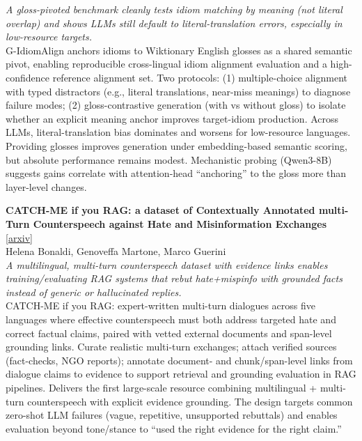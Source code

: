 \documentclass[12pt,letterpaper]{article}
\begin{document}
{\small\textit{A gloss-pivoted benchmark cleanly tests idiom matching by meaning (not literal overlap) and shows LLMs still default to literal-translation errors, especially in low-resource targets.}}\\[1pt]
{\footnotesize G-IdiomAlign anchors idioms to Wiktionary English glosses as a shared semantic pivot, enabling reproducible cross-lingual idiom alignment evaluation and a high-confidence reference alignment set. Two protocols: (1) multiple-choice alignment with typed distractors (e.g., literal translations, near-miss meanings) to diagnose failure modes; (2) gloss-contrastive generation (with vs without gloss) to isolate whether an explicit meaning anchor improves target-idiom production. Across LLMs, literal-translation bias dominates and worsens for low-resource languages. Providing glosses improves generation under embedding-based semantic scoring, but absolute performance remains modest. Mechanistic probing (Qwen3-8B) suggests gains correlate with attention-head ``anchoring'' to the gloss more than layer-level changes.}

\medskip

{\small\textbf{CATCH-ME if you RAG: a dataset of Contextually Annotated multi-Turn Counterspeech against Hate and Misinformation Exchanges}} {\scriptsize[\href{https://arxiv.org/abs/2606.20369}{arxiv}]}\\
{\scriptsize Helena Bonaldi, Genoveffa Martone, Marco Guerini}\\

{\small\textit{A multilingual, multi-turn counterspeech dataset with evidence links enables training/evaluating RAG systems that rebut hate+mispinfo with grounded facts instead of generic or hallucinated replies.}}\\[1pt]
{\footnotesize CATCH-ME if you RAG: expert-written multi-turn dialogues across five languages where effective counterspeech must both address targeted hate and correct factual claims, paired with vetted external documents and span-level grounding links. Curate realistic multi-turn exchanges; attach verified sources (fact-checks, NGO reports); annotate document- and chunk/span-level links from dialogue claims to evidence to support retrieval and grounding evaluation in RAG pipelines. Delivers the first large-scale resource combining multilingual + multi-turn counterspeech with explicit evidence grounding. The design targets common zero-shot LLM failures (vague, repetitive, unsupported rebuttals) and enables evaluation beyond tone/stance to ``used the right evidence for the right claim.''}
\end{document}
